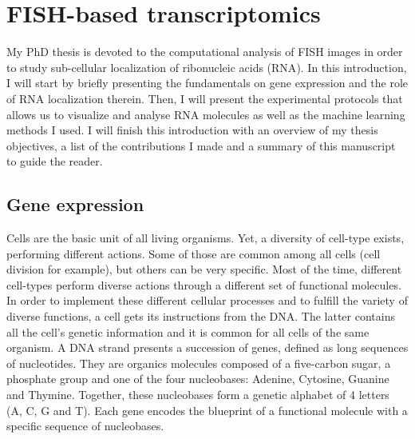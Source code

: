 
\graphicspath{{./figures/introduction/}}

\chapter{FISH-based transcriptomics}
\label{ch:introduction}

\minitoc
\newpage

My PhD thesis is devoted to the computational analysis of FISH images in order to study sub-cellular localization of ribonucleic acids (\ac{RNA}). In this introduction, I will start by briefly presenting the fundamentals on gene expression and the role of RNA localization therein. 
Then, I will present the experimental protocols that allows us to visualize and analyse \ac{RNA} molecules as well as the machine learning methods I used.
I will finish this introduction with an overview of my thesis objectives, a list of the contributions I made and a summary of this manuscript to guide the reader.

\section{Gene expression}
\label{sec:gene_expression}

Cells are the basic unit of all living organisms.
Yet, a diversity of cell-type exists, performing different actions.
Some of those are common among all cells (cell division for example), but others can be very specific.
Most of the time, different cell-types perform diverse actions through a different set of functional molecules.
In order to implement these different cellular processes and to fulfill the variety of diverse functions, a cell gets its instructions from the \ac{DNA}.
The latter contains all the cell's genetic information and it is common for all cells of the same organism.
A \ac{DNA} strand presents a succession of genes, defined as long sequences of nucleotides.
They are organics molecules composed of a five-carbon sugar, a phosphate group and one of the four nucleobases: Adenine, Cytosine, Guanine and Thymine.
Together, these nucleobases form a genetic alphabet of 4 letters (A, C, G and  T).
Each gene encodes the blueprint of a functional molecule with a specific sequence of nucleobases.


